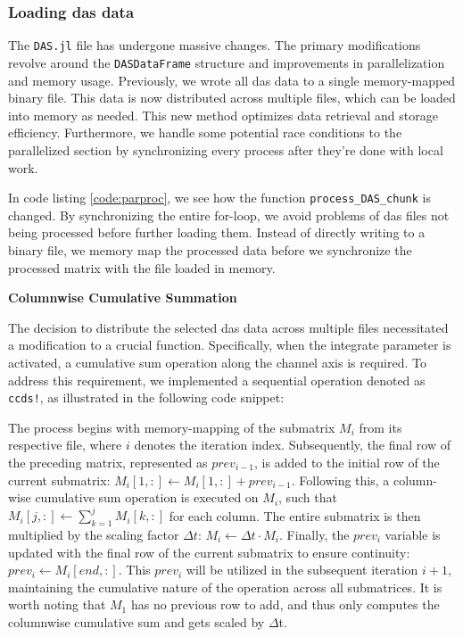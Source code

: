 \subsubsection{Loading \acrshort{das} data}

The \texttt{DAS.jl} file has undergone massive changes. The primary modifications revolve around the \texttt{DASDataFrame} structure and improvements in parallelization and memory usage. Previously, we wrote all \acrshort{das} data to a single memory-mapped binary file. This data is now distributed across multiple files, which can be loaded into memory as needed. This new method optimizes data retrieval and storage efficiency. Furthermore, we handle some potential race conditions to the parallelized section by synchronizing every process after they're done with local work. 



In code listing \ref{code:parproc}, we see how the function \texttt{process\_DAS\_chunk} is changed. By synchronizing the entire for-loop, we avoid problems of \acrshort{das} files not being processed before further loading them. Instead of directly writing to a binary file, we memory map the processed data before we synchronize the processed matrix with the file loaded in memory.

\textbf{Columnwise Cumulative Summation}

The decision to distribute the selected \acrshort{das} data across multiple files necessitated a modification to a crucial function. Specifically, when the integrate parameter is activated, a cumulative sum operation along the channel axis is required. To address this requirement, we implemented a sequential operation denoted as \texttt{ccds!}, as illustrated in the following code snippet:



The process begins with memory-mapping of the submatrix $M_i$ from its respective file, where $i$ denotes the iteration index. Subsequently, the final row of the preceding matrix, represented as $prev_{i-1}$, is added to the initial row of the current submatrix: $M_i[1,:] \leftarrow M_i[1,:] + prev_{i-1}$. Following this, a column-wise cumulative sum operation is executed on $M_i$, such that $M_i[j,:] \leftarrow \sum_{k=1}^j M_i[k,:]$ for each column. The entire submatrix is then multiplied by the scaling factor $\Delta t$: $M_i \leftarrow \Delta t \cdot M_i$. Finally, the $prev_i$ variable is updated with the final row of the current submatrix to ensure continuity: $prev_i \leftarrow M_i[end,:]$. This $prev_i$ will be utilized in the subsequent iteration $i+1$, maintaining the cumulative nature of the operation across all submatrices. It is worth noting that $M_1$ has no previous row to add, and thus only computes the columnwise cumulative sum and gets scaled by $\Delta$t.

